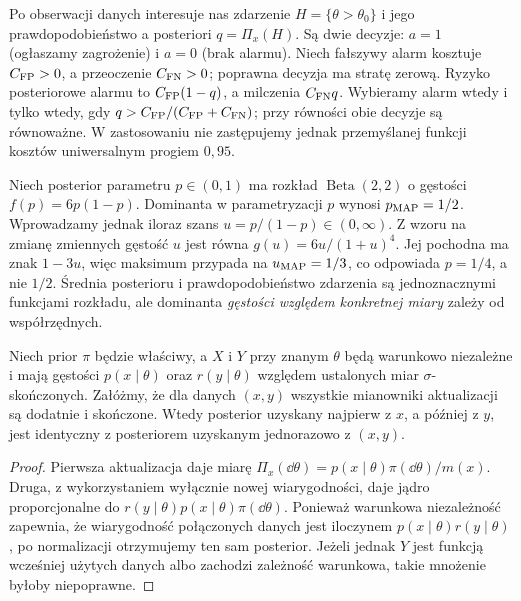 \begin{przyklad}
Po obserwacji danych interesuje nas zdarzenie $H=\{\theta>\theta_0\}$
i jego prawdopodobieństwo a posteriori $q=\Pi_x(H)$.
Są dwie decyzje: $a=1$ (ogłaszamy zagrożenie) i $a=0$ (brak alarmu).
Niech fałszywy alarm kosztuje $C_{\rm FP}>0$, a przeoczenie
$C_{\rm FN}>0$; poprawna decyzja ma stratę zerową.
Ryzyko posteriorowe alarmu to $C_{\rm FP}(1-q)$,
a milczenia $C_{\rm FN}q$. Wybieramy alarm wtedy i tylko wtedy, gdy
$q>C_{\rm FP}/(C_{\rm FP}+C_{\rm FN})$;
przy równości obie decyzje są równoważne.
W zastosowaniu nie zastępujemy jednak przemyślanej funkcji kosztów
uniwersalnym progiem $0{,}95$.
\end{przyklad}

\begin{przyklad}
Niech posterior parametru $p\in(0,1)$ ma rozkład
$\operatorname{Beta}(2,2)$ o gęstości $f(p)=6p(1-p)$.
Dominanta w parametryzacji $p$ wynosi $p_{\rm MAP}=1/2$.
Wprowadzamy jednak iloraz szans $u=p/(1-p)\in(0,\infty)$.
Z wzoru na zmianę zmiennych gęstość $u$ jest równa
$g(u)=6u/(1+u)^4$. Jej pochodna ma znak $1-3u$,
więc maksimum przypada na $u_{\rm MAP}=1/3$,
co odpowiada $p=1/4$, a nie $1/2$.
Średnia posterioru i prawdopodobieństwo zdarzenia są
jednoznacznymi funkcjami rozkładu, ale dominanta
\emph{gęstości względem konkretnej miary} zależy od współrzędnych.
\end{przyklad}

\begin{stwierdzenie}
\label{prop:sequential-bayes}
Niech prior $\pi$ będzie właściwy, a $X$ i $Y$ przy znanym
$\theta$ będą warunkowo niezależne i mają gęstości
$p(x\mid\theta)$ oraz $r(y\mid\theta)$ względem ustalonych
miar $\sigma$-skończonych. Załóżmy, że dla danych $(x,y)$
wszystkie mianowniki aktualizacji są dodatnie i skończone.
Wtedy posterior uzyskany najpierw z $x$, a później z $y$,
jest identyczny z posteriorem uzyskanym jednorazowo z $(x,y)$.
\end{stwierdzenie}
\begin{proof}
Pierwsza aktualizacja daje miarę
$\Pi_x(\dd\theta)=p(x\mid\theta)\pi(\dd\theta)/m(x)$.
Druga, z wykorzystaniem wyłącznie nowej wiarygodności,
daje jądro proporcjonalne do
$r(y\mid\theta)p(x\mid\theta)\pi(\dd\theta)$.
Ponieważ warunkowa niezależność zapewnia, że wiarygodność
połączonych danych jest iloczynem $p(x\mid\theta)r(y\mid\theta)$,
po normalizacji otrzymujemy ten sam posterior.
Jeżeli jednak $Y$ jest funkcją wcześniej użytych danych albo
zachodzi zależność warunkowa, takie mnożenie byłoby niepoprawne.
\end{proof}

